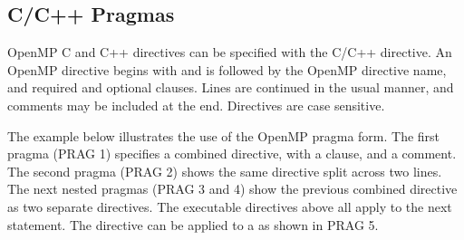 \begin{ccppspecific}[4ex]
\section{C/C++ Pragmas}
\label{sec:pragmas}

OpenMP C and C++ directives can be specified with the C/C++  directive.
An OpenMP directive begins with  and is followed by the 
OpenMP directive name, and required and optional clauses. Lines are continued in the 
usual manner, and comments may be included at the end.
Directives are case sensitive.

The example below illustrates the use of the OpenMP pragma form.
The first pragma (PRAG 1) specifies a combined  
directive, with a  clause, and a comment. 
The second pragma (PRAG 2) shows the same directive split
across two lines. The next nested pragmas (PRAG 3 and 4) show the previous combined directive as 
two separate directives. The executable directives above all apply to the next 
statement. The  directive can be applied to a 
as shown in PRAG 5.

\end{ccppspecific}
